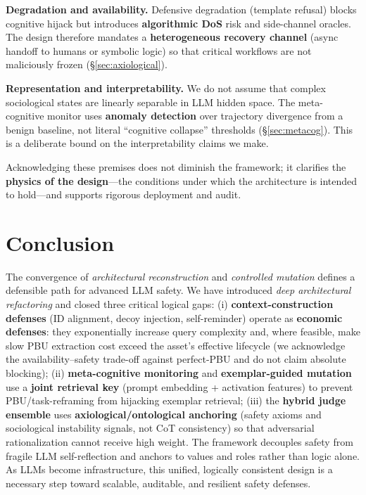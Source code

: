 \documentclass[letterpaper,twocolumn,10pt]{article}
\begin{document}
\textbf{Degradation and availability.} Defensive degradation (template refusal) blocks cognitive hijack but introduces \textbf{algorithmic DoS} risk and side-channel oracles. The design therefore mandates a \textbf{heterogeneous recovery channel} (async handoff to humans or symbolic logic) so that critical workflows are not maliciously frozen (\S\ref{sec:axiological}).

\textbf{Representation and interpretability.} We do not assume that complex sociological states are linearly separable in LLM hidden space. The meta-cognitive monitor uses \textbf{anomaly detection} over trajectory divergence from a benign baseline, not literal ``cognitive collapse'' thresholds (\S\ref{sec:metacog}). This is a deliberate bound on the interpretability claims we make.

Acknowledging these premises does not diminish the framework; it clarifies the \textbf{physics of the design}---the conditions under which the architecture is intended to hold---and supports rigorous deployment and audit.

\section{Conclusion}

The convergence of \emph{architectural reconstruction} and \emph{controlled mutation} defines a defensible path for advanced LLM safety. We have introduced \emph{deep architectural refactoring} and closed three critical logical gaps: (i) \textbf{context-construction defenses} (ID alignment, decoy injection, self-reminder) operate as \textbf{economic defenses}: they exponentially increase query complexity and, where feasible, make slow PBU extraction cost exceed the asset's effective lifecycle (we acknowledge the availability--safety trade-off against perfect-PBU and do not claim absolute blocking); (ii) \textbf{meta-cognitive monitoring} and \textbf{exemplar-guided mutation} use a \textbf{joint retrieval key} (prompt embedding + activation features) to prevent PBU/task-reframing from hijacking exemplar retrieval; (iii) the \textbf{hybrid judge ensemble} uses \textbf{axiological/ontological anchoring} (safety axioms and sociological instability signals, not CoT consistency) so that adversarial rationalization cannot receive high weight. The framework decouples safety from fragile LLM self-reflection and anchors to values and roles rather than logic alone. As LLMs become infrastructure, this unified, logically consistent design is a necessary step toward scalable, auditable, and resilient safety defenses.
\end{document}
